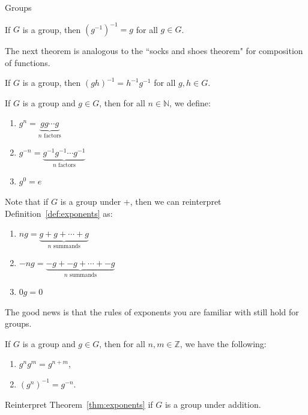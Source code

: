 \begin{section}{Groups}
\begin{theorem}
If $G$ is a group, then $(g^{-1})^{-1}=g$ for all $g\in G$.
\end{theorem}

The next theorem is analogous to the ``socks and shoes theorem" for composition of functions.

\begin{theorem}
If $G$ is a group, then $(gh)^{-1}=h^{-1}g^{-1}$ for all $g,h\in G$.
\end{theorem}

\begin{definition}\label{def:exponents}
If $G$ is a group and $g\in G$, then for all $n\in \mathbb{N}$, we define:
\begin{enumerate}[label=\rm{(\alph*)}]
\item $g^n=\underbrace{gg\cdots g}_{n\text{ factors}}$
\item $g^{-n}=\underbrace{g^{-1}g^{-1}\cdots g^{-1}}_{n\text{ factors}}$
\item $g^0=e$
\end{enumerate}
\end{definition}

Note that if $G$ is a group under $+$, then we can reinterpret Definition~\ref{def:exponents} as:
\begin{enumerate}[label=\rm{(\alph*)}]
\item $ng=\underbrace{g+g+\cdots +g}_{n\text{ summands}}$
\item $-ng=\underbrace{-g+-g+\cdots +-g}_{n\text{ summands}}$
\item $0g=0$
\end{enumerate}

The good news is that the rules of exponents you are familiar with still hold for groups.

\begin{theorem}\label{thm:exponents}
If $G$ is a group and $g\in G$, then for all $n,m\in\mathbb{Z}$, we have the following:
\begin{enumerate}[label=\rm{(\alph*)}]
\item $g^ng^m=g^{n+m}$,
\item $(g^n)^{-1}=g^{-n}$.
\end{enumerate}
\end{theorem}

\begin{problem}
Reinterpret Theorem~\ref{thm:exponents} if $G$ is a group under addition.
\end{problem}

\end{section}

